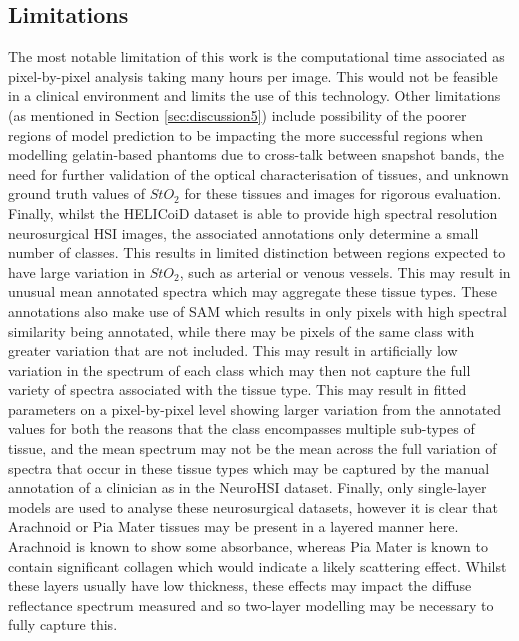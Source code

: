 \subsection{Limitations}
The most notable limitation of this work is the computational time associated as pixel-by-pixel analysis taking many hours per image. This would not be feasible in a clinical environment and limits the use of this technology. Other limitations (as mentioned in Section \ref{sec:discussion5}) include possibility of the poorer regions of model prediction to be impacting the more successful regions when modelling gelatin-based phantoms due to cross-talk between snapshot bands, the need for further validation of the optical characterisation of tissues, and unknown ground truth values of $StO_2$ for these tissues and images for rigorous evaluation. Finally, whilst the HELICoiD dataset is able to provide high spectral resolution neurosurgical HSI images, the associated annotations only determine a small number of classes. This results in limited distinction between regions expected to have large variation in $StO_2$, such as arterial or venous vessels. This may result in unusual mean annotated spectra which may aggregate these tissue types. These annotations also make use of SAM which results in only pixels with high spectral similarity being annotated, while there may be pixels of the same class with greater variation that are not included. This may result in artificially low variation in the spectrum of each class which may then not capture the full variety of spectra associated with the tissue type. This may result in fitted parameters on a pixel-by-pixel level showing larger variation from the annotated values for both the reasons that the class encompasses multiple sub-types of tissue, and the mean spectrum may not be the mean across the full variation of spectra that occur in these tissue types which may be captured by the manual annotation of a clinician as in the NeuroHSI dataset. Finally, only single-layer models are used to analyse these neurosurgical datasets, however it is clear that Arachnoid or Pia Mater tissues may be present in a layered manner here. Arachnoid is known to show some absorbance, whereas Pia Mater is known to contain significant collagen which would indicate a likely scattering effect\cite{Ghannam2023}. Whilst these layers usually have low thickness\cite{Ghannam2023}, these effects may impact the diffuse reflectance spectrum measured and so two-layer modelling may be necessary to fully capture this. 

